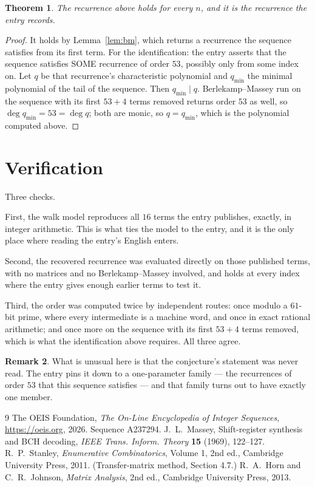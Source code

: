 \documentclass[11pt,a4paper]{article}
\theoremstyle{plain}
\newtheorem{theorem}{Theorem}
\theoremstyle{definition}
\newtheorem{remark}[theorem]{Remark}
\begin{document}
\begin{theorem}
The recurrence above holds for every $n$, and it is the recurrence the entry records.
\end{theorem}

\begin{proof}
It holds by Lemma~\ref{lem:bm}, which returns a recurrence the sequence satisfies from its
first term. For the identification: the entry asserts that the sequence satisfies SOME
recurrence of order $53$, possibly only from some index on. Let $q$ be that recurrence's
characteristic polynomial and $q_{\min}$ the minimal polynomial of the tail of the sequence.
Then $q_{\min}\mid q$. Berlekamp--Massey run on the sequence with its first $53+4$ terms
removed returns order $53$ as well, so $\deg q_{\min}=53=\deg q$; both are monic, so
$q=q_{\min}$, which is the polynomial computed above.
\end{proof}

\section{Verification}

Three checks.

First, the walk model reproduces all $16$ terms the entry publishes, exactly, in integer
arithmetic. This is what ties the model to the entry, and it is the only place where reading
the entry's English enters.

Second, the recovered recurrence was evaluated directly on those published terms, with no
matrices and no Berlekamp--Massey involved, and holds at every index where the entry gives
enough earlier terms to test it.

Third, the order was computed twice by independent routes: once modulo a $61$-bit prime, where
every intermediate is a machine word, and once in exact rational arithmetic; and once more on
the sequence with its first $53+4$ terms removed, which is what the identification above
requires. All three agree.

\begin{remark}
What is unusual here is that the conjecture's statement was never read. The entry pins it down
to a one-parameter family --- the recurrences of order $53$ that this sequence satisfies
--- and that family turns out to have exactly one member.
\end{remark}

\begin{thebibliography}{9}
 The OEIS Foundation, \emph{The On-Line Encyclopedia of Integer
Sequences}, \url{https://oeis.org}, 2026. Sequence A237294.
 J.~L.~Massey, Shift-register synthesis and BCH decoding, \emph{IEEE
Trans. Inform. Theory} \textbf{15} (1969), 122--127.
 R.~P.~Stanley, \emph{Enumerative Combinatorics}, Volume 1, 2nd ed.,
Cambridge University Press, 2011. (Transfer-matrix method, Section 4.7.)
 R.~A.~Horn and C.~R.~Johnson, \emph{Matrix Analysis}, 2nd ed., Cambridge
University Press, 2013.
\end{thebibliography}
\end{document}
